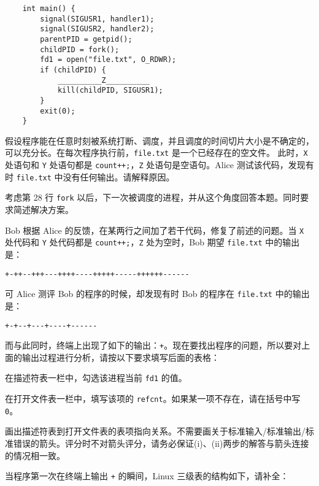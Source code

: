 \begin{problems}
\begin{verbatim}
    int main() {
        signal(SIGUSR1, handler1);
        signal(SIGUSR2, handler2);
        parentPID = getpid();
        childPID = fork();
        fd1 = open("file.txt", O_RDWR);
        if (childPID) {
            __________Z__________
            kill(childPID, SIGUSR1);
        }
        exit(0);
    }
        \end{verbatim}
        假设程序能在任意时刻被系统打断、调度，并且调度的时间切片大小是不确定的，可以充分长。在每次程序执行前，\verb|file.txt| 是一个已经存在的空文件。
        \qn 此时，\verb|X| 处语句和 \verb|Y| 处语句都是 \verb|count++;|，\verb|Z| 处语句是空语句。Alice 测试该代码，发现有时 \verb|file.txt| 中没有任何输出。请解释原因。
        
        \begin{hint}
            考虑第 28 行 \verb|fork| 以后，下一次被调度的进程，并从这个角度回答本题。同时要求简述解决方案。
        \end{hint}
        \qn Bob 根据 Alice 的反馈，在某两行之间加了若干代码，修复了前述的问题。当 \verb|X| 处代码和 \verb|Y| 处代码都是 \verb|count++;|，\verb|Z| 处为空时，Bob 期望 \verb|file.txt| 中的输出是：
        \begin{center}
            \verb|+-++--+++---++++----+++++-----++++++------|
        \end{center}
        可 Alice 测评 Bob 的程序的时候，却发现有时 Bob 的程序在 \verb|file.txt| 中的输出是：
        \begin{center}
            \verb|+-+--+---+----+------|
        \end{center}
        而与此同时，终端上出现了如下的输出：\verb|+|。现在要找出程序的问题，所以要对上面的输出过程进行分析，请按以下要求填写后面的表格：
        \begin{compactenum}[(i)]
            \item 在描述符表一栏中，勾选该进程当前 \verb|fd1| 的值。
            \item 在打开文件表一栏中，填写该项的 \verb|refcnt|。如果某一项不存在，请在括号中写 \verb|0|。
            \item 画出描述符表到打开文件表的表项指向关系。不需要画关于标准输入/标准输出/标准错误的箭头。评分时不对箭头评分，请务必保证(i)、(ii)两步的解答与箭头连接的情况相一致。
        \end{compactenum}
        \subqn 当程序第一次在终端上输出 \verb|+| 的瞬间，Linux 三级表的结构如下，请补全：
        \begin{table}[H]
            \tt
            \centering
            \begin{tabular}{cccccc}

\end{tabular}
\end{table}
\end{problems}
